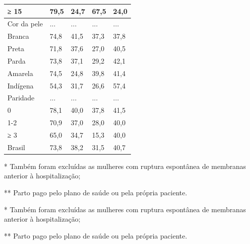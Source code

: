\documentclass{article}
\begin{document}
\begin{table}
\begin{xtabular}{ l | l | l | l | l }
≥ 15
& 79,5
& 24,7
& 67,5
& 24,0
\\ \hline

Cor da pele
& ...
& ...
& ...
& ...
\\ \hline

Branca
& 74,8
& 41,5
& 37,3
& 37,8
\\ \hline

Preta
& 71,8
& 37,6
& 27,0
& 40,5
\\ \hline

Parda
& 73,8
& 37,1
& 29,2
& 42,1
\\ \hline

Amarela
& 74,5
& 24,8
& 39,8
& 41,4
\\ \hline

Indígena
& 54,3
& 31,7
& 26,6
& 57,4
\\ \hline

Paridade
& ...
& ...
& ...
& ...
\\ \hline

0
& 78,1
& 40,0
& 37,8
& 41,5
\\ \hline

1-2
& 70,9
& 37,0
& 28,0
& 40,0
\\ \hline

≥ 3
& 65,0
& 34,7
& 15,3
& 40,0
\\ \hline

Brasil
& 73,8
& 38,2
& 31,5
& 40,7
\\ \hline

\end{xtabular}
\end{table}

* Também foram excluídas as mulheres com ruptura espontânea de
membranas anterior à hospitalização;

** Parto pago pelo plano de saúde ou pela própria paciente.

* Também foram excluídas as mulheres com ruptura espontânea de
membranas anterior à hospitalização;

** Parto pago pelo plano de saúde ou pela própria paciente.
\end{document}
